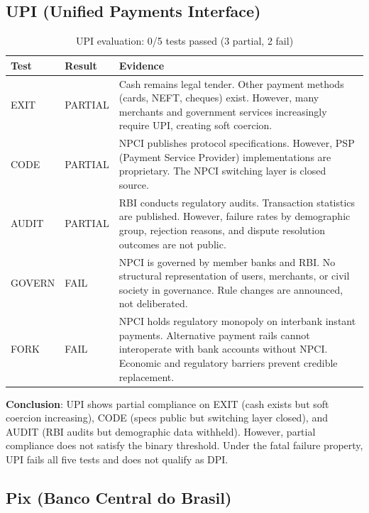 \documentclass[11pt,a4paper]{article}
\newcommand{\tfail}{\textcolor{failred}{FAIL}}
\newcommand{\tpartial}{\textcolor{partialorange}{PARTIAL}}
\begin{document}
\subsection{UPI (Unified Payments Interface)}

\begin{table}[htbp]
\centering
\begin{tabular}{@{}llp{7cm}@{}}
\toprule
\textbf{Test} & \textbf{Result} & \textbf{Evidence} \\
\midrule
EXIT & \tpartial & Cash remains legal tender. Other payment methods (cards, NEFT, cheques) exist. However, many merchants and government services increasingly require UPI, creating soft coercion. \\
\addlinespace
CODE & \tpartial & NPCI publishes protocol specifications. However, PSP (Payment Service Provider) implementations are proprietary. The NPCI switching layer is closed source. \\
\addlinespace
AUDIT & \tpartial & RBI conducts regulatory audits. Transaction statistics are published. However, failure rates by demographic group, rejection reasons, and dispute resolution outcomes are not public. \\
\addlinespace
GOVERN & \tfail & NPCI is governed by member banks and RBI. No structural representation of users, merchants, or civil society in governance. Rule changes are announced, not deliberated. \\
\addlinespace
FORK & \tfail & NPCI holds regulatory monopoly on interbank instant payments. Alternative payment rails cannot interoperate with bank accounts without NPCI. Economic and regulatory barriers prevent credible replacement. \\
\bottomrule
\end{tabular}
\caption{UPI evaluation: 0/5 tests passed (3 partial, 2 fail)}
\end{table}

\textbf{Conclusion}: UPI shows partial compliance on EXIT (cash exists but soft coercion increasing), CODE (specs public but switching layer closed), and AUDIT (RBI audits but demographic data withheld). However, partial compliance does not satisfy the binary threshold. Under the fatal failure property, UPI fails all five tests and does not qualify as DPI.

\subsection{Pix (Banco Central do Brasil)}
\end{document}
